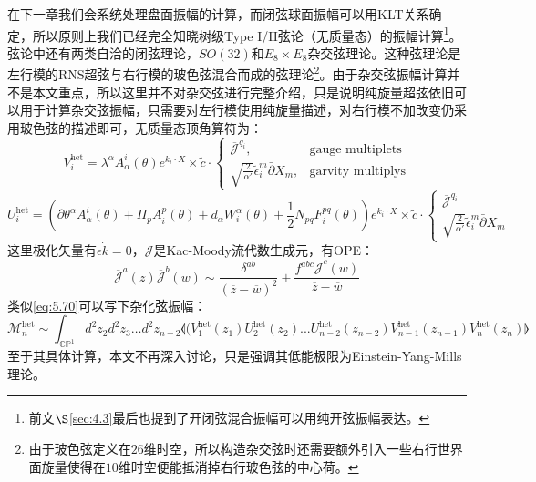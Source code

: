 在下一章我们会系统处理盘面振幅的计算，而闭弦球面振幅可以用KLT关系确定，所以原则上我们已经完全知晓树级Type I/II弦论（无质量态）的振幅计算\footnote{前文$\S$\ref{sec:4.3}最后也提到了开闭弦混合振幅可以用纯开弦振幅表达。}。弦论中还有两类自洽的闭弦理论，$SO(32)$和$E_8\times E_8$杂交弦理论\cite{Gross:1984dd,Gross:1985fr,Gross:1985rr}。这种弦理论是左行模的RNS超弦与右行模的玻色弦混合而成的弦理论\footnote{由于玻色弦定义在$26$维时空，所以构造杂交弦时还需要额外引入一些右行世界面旋量使得在$10$维时空便能抵消掉右行玻色弦的中心荷。}。由于杂交弦振幅计算并不是本文重点，所以这里并不对杂交弦进行完整介绍，只是说明纯旋量超弦依旧可以用于计算杂交弦振幅，只需要对左行模使用纯旋量描述，对右行模不加改变仍采用玻色弦的描述即可，无质量态顶角算符为：
\begin{equation}
	V_i^{\mathrm{het}}=\lambda^\alpha A_\alpha^i(\theta)e^{k_i\cdot X}\times\tilde{c}\cdot
	\begin{cases}
		\overline{\mathcal{J}}^{q_i},&\text{gauge multiplets}\\
		\sqrt{\frac2{\alpha'}}\tilde\epsilon_i^m\bar{\partial}X_m,&\text{garvity multiplys}
	\end{cases}
\end{equation}
\begin{equation}
	U_i^{\mathrm{het}}=\left(\partial\theta^\alpha A_\alpha^i(\theta)+\Pi_pA_i^p(\theta)+d_\alpha W_i^\alpha(\theta)+\frac{1}{2}N_{pq}F_i^{pq}(\theta)\right)e^{k_i\cdot X}\times
	\tilde c\cdot
	\begin{cases}
	\overline{\mathcal{J}}^{q_i}\\
	\sqrt{\frac2{\alpha'}}\tilde\epsilon_i^m\bar{\partial}X_m
	\end{cases}
\end{equation}
这里极化矢量有$\epsilon\dot k =0$，$\mathcal{J}$是Kac-Moody流代数生成元，有OPE：
\begin{equation}
	\overline{\mathcal{J}}^a(z)\overline{\mathcal{J}}^b(w)\sim\frac{\delta^{ab}}{(\overline{z}-\overline{w})^2}+\frac{f^{abc}\overline{\mathcal{J}}^c(w)}{\overline{z}-\overline{w}}
\end{equation}
类似\ref{eq:5.70}可以写下杂化弦振幅：
\begin{equation}
	\mathcal{M}_{n}^{\mathrm{het}}\sim\int_{\mathbb{CP}^{1}}d^{2}z_{2}d^{2}z_{3}\ldots d^{2}z_{n-2}\llangle(V_{1}^{\mathrm{het}}(z_{1})U_{2}^{\mathrm{het}}(z_{2})...U_{n-2}^{\mathrm{het}}(z_{n-2})V_{n-1}^{\mathrm{het}}(z_{n-1})V_{n}^{\mathrm{het}}(z_{n})\rrangle
\end{equation}
至于其具体计算，本文不再深入讨论，只是强调其低能极限为Einstein-Yang-Mills理论。\cite{Du:2017gnh,Fu:2017uzt}
